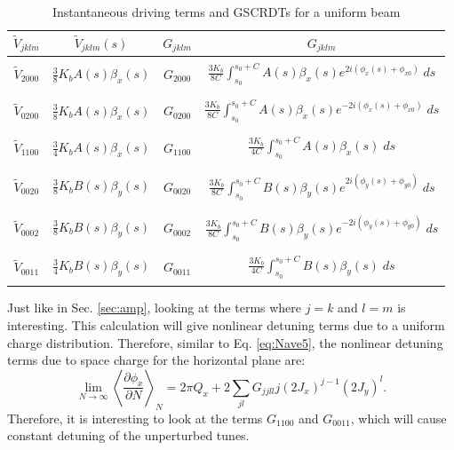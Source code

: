 \begin{table}[H]
    \centering
    \caption{Instantaneous driving terms and GSCRDTs for a uniform beam}
    \label{tab:vjklms}
    \begin{tabular}{|c|c|c|c|}
    \hline
    $\tilde{V}_{jklm}$  &  $\tilde{V}_{jklm}(s)$ & $G_{jklm}$  &  $G_{jklm}$  \\ \hline
    & & & \\
    $\tilde{V}_{2000}$ &  $\frac{3}{8} K_b A(s) \beta_x(s)$ & $G_{2000}$ & $\frac{3K_b}{8C}{\displaystyle\int_{s_0}^{s_0+C} A(s) \beta_x(s) e^{2 i \left( \phi_x(s)+\phi_{x0} \right)} \; ds}$ \\ 
    & & & \\ \hline
    & & & \\
    $\tilde{V}_{0200}$ &  $\frac{3}{8} K_b A(s) \beta_x(s)$ & $G_{0200}$ & $\frac{3K_b}{8C}{\displaystyle\int_{s_0}^{s_0+C} A(s) \beta_x(s) e^{-2 i \left( \phi_x(s)+\phi_{x0} \right)} \; ds}$\\ 
    & & & \\ \hline
    & & & \\
    $\tilde{V}_{1100}$ &  $\frac{3}{4} K_b A(s) \beta_x(s)$ & $G_{1100}$ & $\frac{3K_b}{4C}{\displaystyle\int_{s_0}^{s_0+C} A(s) \beta_x(s) \; ds}$\\ 
    & & & \\ \hline
    & & & \\
    $\tilde{V}_{0020}$ &  $\frac{3}{8} K_b B(s) \beta_y(s)$ & $G_{0020}$ & $\frac{3K_b}{8C}{\displaystyle\int_{s_0}^{s_0+C} B(s) \beta_y(s) e^{2 i \left( \phi_y(s)+\phi_{y0} \right)} \; ds}$\\ 
    & & & \\ \hline
    & & & \\
    $\tilde{V}_{0002}$ &  $\frac{3}{8} K_b B(s) \beta_y(s)$ & $G_{0002}$ & $\frac{3K_b}{8C}{\displaystyle\int_{s_0}^{s_0+C} B(s) \beta_y(s) e^{-2 i \left( \phi_y(s)+\phi_{y0} \right)} \; ds}$\\ 
    & & & \\ \hline
    & & & \\
    $\tilde{V}_{0011}$ &  $\frac{3}{4} K_b B(s) \beta_y(s)$ & $G_{0011}$ & $\frac{3K_b}{4C}{\displaystyle\int_{s_0}^{s_0+C} B(s) \beta_y(s) \; ds}$\\ 
    & & & \\ \hline
    \end{tabular}
    \end{table}

Just like in Sec. \ref{sec:amp}, looking at the terms where $j=k$ and $l=m$ is interesting. This calculation will give nonlinear detuning terms due to a uniform charge distribution. Therefore, similar to Eq. \ref{eq:Nave5}, the nonlinear detuning terms due to space charge for the horizontal plane are:
\begin{equation}
    \label{eq:scave1}
    \lim_{N\to\infty} \left\langle \frac{\partial \phi_x}{\partial N}\right\rangle _N = 2\pi Q_x+2\sum_{jl} G_{jjll} j \left( 2 J_x\right)^{j-1} \left( 2 J_y\right)^{l}.
\end{equation}
Therefore, it is interesting to look at the terms $G_{1100}$ and $G_{0011}$, which will cause constant detuning of the unperturbed tunes. 


